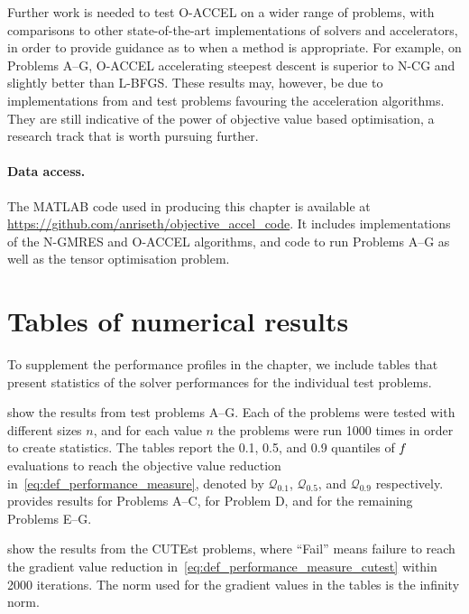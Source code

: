 \documentclass[main.tex]{subfiles}
\begin{document}
Further work is needed to test O-ACCEL on a wider range of problems,
with comparisons to other state-of-the-art implementations of solvers
and accelerators, in order to provide guidance as to when a method is
appropriate.  For example, on Problems A--G, O-ACCEL accelerating
steepest descent is superior to N-CG and slightly better than
L-BFGS. These results may, however, be due to implementations from
\citet{sterck2013steepest} and test problems favouring the
acceleration algorithms. They are still indicative of the power of
objective value based optimisation, a research track that is worth
pursuing further.


\paragraph*{Data access.}
The MATLAB code used in producing this chapter is available at
\url{https://github.com/anriseth/objective_accel_code}.  It includes
implementations of the N-GMRES and O-ACCEL algorithms, and code
to run Problems A--G as well as the tensor optimisation problem.

\section{Tables of numerical results}\label{sec:objacc_tables}
To supplement the performance profiles in the chapter, we include
tables that present statistics of the solver performances for the
individual test problems.

 show the results from test problems A--G.
Each of the problems were tested with different sizes $n$, and for
each value $n$ the problems were run \num{1000} times in order to
create statistics.  The tables report the \num{0.1}, \num{0.5}, and
\num{0.9} quantiles of $f$ evaluations to reach the objective value
reduction in~\eqref{eq:def_performance_measure}, denoted by
$\mathcal{Q}_{0.1}$, $\mathcal{Q}_{0.5}$, and $\mathcal{Q}_{0.9}$
respectively.   provides results for Problems A--C,
 for Problem D,
and  for the remaining Problems E--G.

 show the results from the
CUTEst problems, where ``Fail'' means failure to reach the gradient
value reduction in~\eqref{eq:def_performance_measure_cutest} within
\num{2000} iterations.  The norm used for the gradient values in the
tables is the infinity norm.
\end{document}
